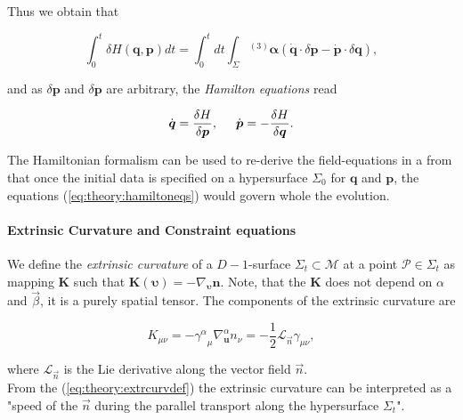Thus we obtain that 

\begin{equation}
\int_{0}^{t} \delta H(\boldsymbol{q},\boldsymbol{p})dt =   \int_{0}^{t}dt\int_{\Sigma}{^{(3)}\boldsymbol{\alpha}}(\dot{\boldsymbol{q}}\cdot\delta\boldsymbol{p}-\dot{\boldsymbol{p}}\cdot\delta\boldsymbol{q}),
\end{equation}

and as $\delta\boldsymbol{p}$ and $\delta\boldsymbol{p}$ are arbitrary, the \textit{Hamilton equations} read

\begin{equation}
\dot{\boldsymbol{q}}=\frac{\delta H}{\delta\boldsymbol{p}}, \hspace{5mm} \dot{\boldsymbol{p}} = -\frac{\delta H}{\delta\boldsymbol{q}}.
\label{eq:theory:hamiltoneqs}
\end{equation}

The Hamiltonian formalism can be used to re-derive the field-equations in a from that once the initial data is specified on a hypersurface $\Sigma_0$ for $\boldsymbol{q}$ and $\boldsymbol{p}$, the equations (\ref{eq:theory:hamiltoneqs}) would govern whole the evolution.


\paragraph{Extrinsic Curvature and Constraint equations}


We define the \textit{extrinsic curvature} of a $D-1$-surface $\Sigma_t\subset\mathcal{M}$ at a point $\mathcal{P}\in\Sigma_t$ as mapping $\boldsymbol{K}$ such that $\boldsymbol{K}(\boldsymbol{\upsilon})=-\nabla_{\boldsymbol{\upsilon}}\boldsymbol{n}$. 
Note, that the $\boldsymbol{K}$ does not depend on $\alpha$ and $\vec{\beta}$, it is a purely spatial tensor. 
The components of the extrinsic curvature are 

\begin{equation}
K_{\mu\nu} = -{\gamma^{\alpha}}_{\mu}\nabla_{\boldsymbol{u}}^{\alpha} n_{\nu} = -\frac{1}{2}\mathcal{L}_{\vec{n}}\gamma_{\mu\nu},
\label{eq:theory:extrcurvdef}
\end{equation}

where $\mathcal{L}_{\vec{n}}$ is the Lie derivative along the vector field $\vec{n}$. \\
From the (\ref{eq:theory:extrcurvdef}) the extrinsic curvature can be interpreted as a "speed of the $\vec{n}$ during the parallel transport along the hypersurface $\Sigma_t$".

